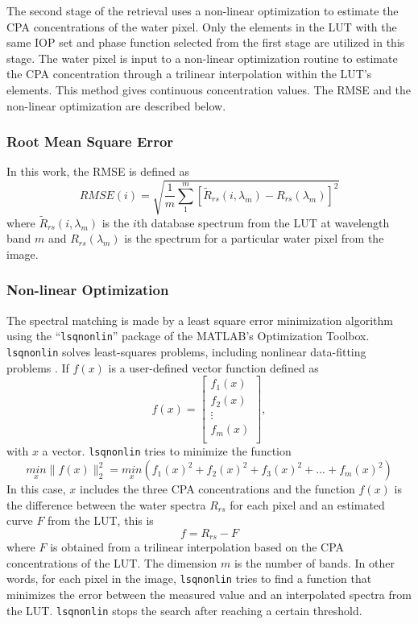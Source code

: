 \documentclass[onecolumn,3p,letterpaper,11pt]{elsarticle}
\begin{document}
The second stage of the retrieval uses a non-linear optimization to estimate the CPA concentrations of the water pixel. Only the elements in the LUT with the same IOP set and phase function selected from the first stage are utilized in this stage. The water pixel is input to a non-linear optimization routine to estimate the CPA concentration through a trilinear interpolation within the LUT's elements. This method gives continuous concentration values. The RMSE and the non-linear optimization are described below.
\subsubsection{Root Mean Square Error}
In this work, the RMSE is defined as
\begin{equation}
  RMSE(i) = \sqrt{\frac{1}{m}\sum_1^m\left[\widetilde{R}_{rs}(i,\lambda_m)-R_{rs}(\lambda_m)\right]^2}
\end{equation}
where $\widetilde{R}_{rs}(i,\lambda_m)$ is the $i$th database spectrum from the LUT at wavelength band $m$ and $R_{rs}(\lambda_m)$ is the spectrum for a particular water pixel from the image.

\subsubsection{Non-linear Optimization}
The spectral matching is made by a least square error minimization algorithm using the ``\texttt{lsqnonlin}'' package of the MATLAB's Optimization Toolbox. \texttt{lsqnonlin} solves least-squares problems, including nonlinear data-fitting problems \citep{MatlabHelp}. If $f(x)$ is a user-defined vector function defined as
\begin{equation}
  f(x)=
  \left[
    \begin{array}{c}
      f_1(x) \\
      f_2(x) \\
      \vdots \\
      f_m(x) \\
    \end{array}
  \right],
\end{equation}
with $x$ a vector. \texttt{lsqnonlin} tries to minimize the function
\begin{equation}
  \underset{x}{min}\parallel f(x) \parallel^2_2=\underset{x}{min}(f_1(x)^2+f_2(x)^2+f_3(x)^2+...+f_m(x)^2)
\end{equation}
In this case, $x$ includes the three CPA concentrations and the function $f(x)$ is the difference between the water spectra $R_{rs}$ for each pixel and an estimated curve $F$ from the LUT, this is
\begin{equation}
  f = R_{rs} - F
\end{equation}
where $F$ is obtained from a trilinear interpolation based on the CPA concentrations of the LUT. The dimension $m$ is the number of bands. In other words, for each pixel in the image, \texttt{lsqnonlin} tries to find a function that minimizes the error between the measured value and an interpolated spectra from the LUT. \texttt{lsqnonlin} stops the search after reaching a certain threshold. 
\end{document}
